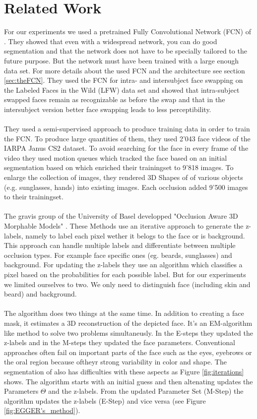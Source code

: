 \section{Related Work}
For our experiments we used a pretrained Fully Convolutional Network (FCN) of \cite{nirkin2018_faceswap}. They showed that even with a widespread network, you can do good segmentation and that the network does not have to be specially tailored to the future purpose. But the network must have been trained with a large enough data set. For more details about the used FCN and the architecture see section \ref{sec:theFCN}. They used the FCN for intra- and intersubject face swapping on the Labeled Faces in the Wild (LFW) data set and showed that intra-subject swapped faces remain as recognizable as before the swap and that in the intersubject version better face swapping  leads to less perceptibility.\\
\\
They used a semi-supervised approach to produce training data in order to train the FCN. To produce large quantities of them, they used 2'043 face videos of the IARPA Janus CS2 dataset. To avoid searching for the face in every frame of the video they used motion queues which tracked the face based on an initial segmentation based on \cite{grundmann} which enriched their trainingset to 9'818 images. To enlarge the collection of images, they rendered 3D Shapes of of various objects (e.g. sunglasses, hands) into existing images. Each occlusion added 9'500 images to their trainingset.\\
\\
The gravis group of the University of Basel developped "Occlusion Aware 3D Morphable Models" \cite{egger_paper}. These Methods use an iterative approach to generate the z-labels, namely to label each pixel wether it belogs to the face or is background. This approach can handle multiple labels and differentiate between multiple occlusion types. For example face specific ones (eg. beards, sunglasses) and background. For updating the z-labels they use an algorithm which classifies a pixel based on the probabilities for each possible label.  But for our experiments we limited ourselves to two. We only need to distinguish face (including skin and beard) and background.\\ 
\\
The algorithm does two things at the same time. In addition to creating a face mask, it estimates a 3D reconstruction of the depicted face. It's an EM-algorithm like method to solve two problems simultaneusly. In the E-steps they updated the z-labels and in the M-steps they updated the face parameters. Conventional approaches often fail on important parts of the face such as the eyes, eyebrows or the oral region because oftheyr strong variability in color and shape. The segmentation of \cite{egger_paper} also has difficulties with these aspects as Figure \ref{fig:iterations} shows. The algorithm starts with an initial guess and then altenating updates the Parameters $\Theta$ and the z-labels. From the updated Parameter Set (M-Step) the algorithm updates the z-labels (E-Step) and vice versa (see Figure \ref{fig:EGGER's_method}).\\
